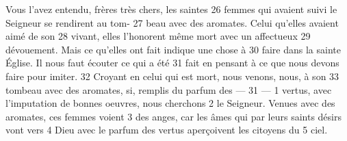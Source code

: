 Vous l'avez entendu, frères très chers, les saintes	 
26	 	femmes qui avaient suivi le Seigneur se rendirent au tom-	 
27	 	beau avec des aromates. Celui qu'elles avaient aimé de son	 
28	 	vivant, elles l'honorent même mort avec un affectueux	 
29	 	dévouement. Mais ce qu'elles ont fait indique une chose à	 
30	 	faire dans la sainte Église. Il nous faut écouter ce qui a été	 
31	 	fait en pensant à ce que nous devons faire pour imiter.	 
32	 	Croyant en celui qui est mort, nous venons, nous, à son	 
33	 	tombeau avec des aromates, si, remplis du parfum des	 
 	--- 31 ---	 
1	 	vertus, avec l'imputation de bonnes oeuvres, nous cherchons	 
2	 	le Seigneur. Venues avec des aromates, ces femmes voient	 
3	 	des anges, car les âmes qui par leurs saints désirs vont vers	 
4	 	Dieu avec le parfum des vertus aperçoivent les citoyens du	 
5	 	ciel.